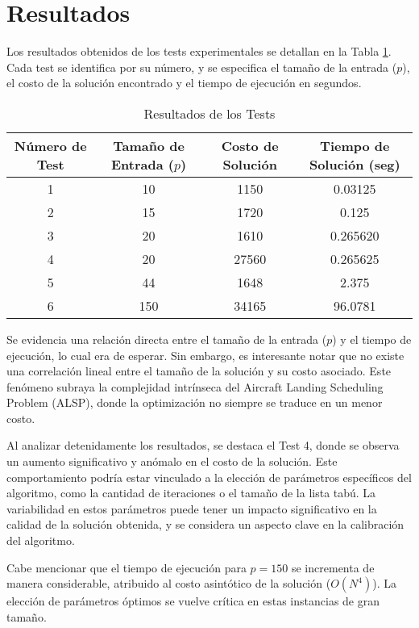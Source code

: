 \documentclass[letter, 10pt]{article}
\begin{document}
\section{Resultados}

Los resultados obtenidos de los tests experimentales se detallan en la Tabla \ref{tab:resultados_tests}. Cada test se identifica por su n\'umero, y se especifica el tama\~{n}o de la entrada (\(p\)), el costo de la soluci\'on encontrado y el tiempo de ejecuci\'on en segundos.

\begin{table}[ht]
\centering
\begin{tabular}{|c|c|c|c|}
\hline
N\'umero de Test & Tama\~{n}o de Entrada (\(p\)) & Costo de Soluci\'on & Tiempo de Soluci\'on (seg) \\
\hline
1 & 10 & 1150 & 0.03125 \\
2 & 15 & 1720 & 0.125 \\
3 & 20 & 1610 & 0.265620 \\
4 & 20 & 27560 & 0.265625 \\
5 & 44 & 1648 & 2.375 \\
6 & 150 & 34165 & 96.0781 \\
\hline
\end{tabular}
\caption{Resultados de los Tests}
\label{tab:resultados_tests}
\end{table}

Se evidencia una relaci\'on directa entre el tama\~{n}o de la entrada (\(p\)) y el tiempo de ejecuci\'on, lo cual era de esperar. Sin embargo, es interesante notar que no existe una correlaci\'on lineal entre el tama\~{n}o de la soluci\'on y su costo asociado. Este fen\'omeno subraya la complejidad intr\'inseca del Aircraft Landing Scheduling Problem (ALSP), donde la optimizaci\'on no siempre se traduce en un menor costo.

Al analizar detenidamente los resultados, se destaca el Test 4, donde se observa un aumento significativo y an\'omalo en el costo de la soluci\'on. Este comportamiento podr\'ia estar vinculado a la elecci\'on de par\'ametros espec\'ificos del algoritmo, como la cantidad de iteraciones o el tama\~{n}o de la lista tab\'u. La variabilidad en estos par\'ametros puede tener un impacto significativo en la calidad de la soluci\'on obtenida, y se considera un aspecto clave en la calibraci\'on del algoritmo.

Cabe mencionar que el tiempo de ejecuci\'on para \(p = 150\) se incrementa de manera considerable, atribuido al costo asint\'otico de la soluci\'on (\(O(N^4)\)). La elecci\'on de par\'ametros \'optimos se vuelve cr\'itica en estas instancias de gran tama\~{n}o.
\end{document}
